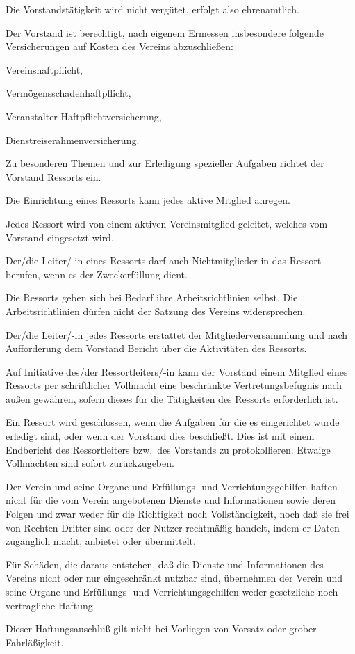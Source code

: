\documentclass[draft]{scrartcl}
\begin{document}
\begin{contract}
Die Vorstandstätigkeit wird nicht vergütet, erfolgt also ehrenamtlich.

\pagebreak\enlargethispage{\textheight}
Der Vorstand ist berechtigt, nach eigenem Ermessen insbesondere folgende
Versicherungen auf Kosten des Vereins abzuschließen:
\begin{compactenum}[\hspace{2em}1.]
  \item Vereinshaftpflicht,
  \item Vermögensschadenhaftpflicht,
  \item Veranstalter-Haftpflichtversicherung,
  \item Dienstreiserahmenversicherung.
\end{compactenum}


Zu besonderen Themen und zur Erledigung spezieller Aufgaben richtet der
Vorstand Ressorts ein.

Die Einrichtung eines Ressorts kann jedes aktive Mitglied anregen.

Jedes Ressort wird von einem aktiven Vereinsmitglied geleitet, welches vom
Vorstand eingesetzt wird.

Der/die Leiter/-in eines Ressorts darf auch Nichtmitglieder in das Ressort
berufen, wenn es der Zweckerfüllung dient.

Die Ressorts geben sich bei Bedarf ihre Arbeitsrichtlinien selbst. Die
Arbeitsrichtlinien dürfen nicht der Satzung des Vereins widersprechen.

Der/die Leiter/-in jedes Ressorts erstattet der Mitgliederversammlung und nach
Auf\/\-for\-derung dem Vorstand Bericht über die Aktivitäten des Ressorts.

Auf Initiative des/der Ressortleiters/-in kann der Vorstand einem Mitglied
eines Ressorts per schriftlicher Vollmacht eine beschränkte
Vertretungsbefugnis nach außen gewähren, sofern dieses für die Tätigkeiten des
Ressorts erforderlich ist.

Ein Ressort wird geschlossen, wenn die Aufgaben für die es eingerichtet wurde
erledigt sind, oder wenn der Vorstand dies beschließt. Dies ist mit einem
Endbericht des Ressortleiters bzw.\ des Vorstands zu protokollieren. Etwaige
Vollmachten sind sofort zurückzugeben.


Der Verein und seine Organe und Erfüllungs- und Verrichtungsgehilfen haften
nicht für die vom Verein angebotenen Dienste und Informationen sowie deren
Folgen und zwar weder für die Richtigkeit noch Vollständigkeit, noch daß sie
frei von Rechten Dritter sind oder der Nutzer rechtmäßig handelt, indem er
Daten zugänglich macht, anbietet oder übermittelt.

Für Schäden, die daraus entstehen, daß die Dienste und Informationen des
Vereins nicht oder nur eingeschränkt nutzbar sind, übernehmen der Verein und
seine Organe und Erfüllungs- und Verrichtungsgehilfen weder gesetzliche noch
vertragliche Haftung.

Dieser Haftungsauschluß gilt nicht bei Vorliegen von Vorsatz oder grober
Fahr\-läß\-ig\-keit.

\end{contract}
\end{document}
